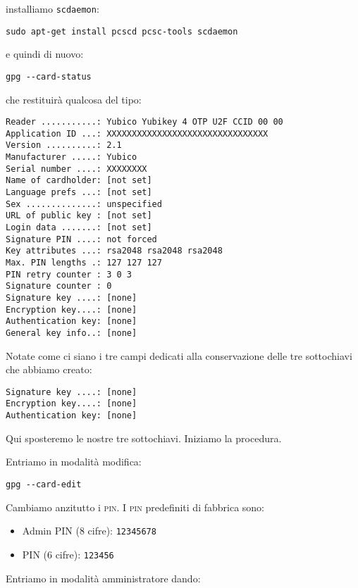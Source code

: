 installiamo \texttt{scdaemon}:

\begin{lstlisting}
sudo apt-get install pcscd pcsc-tools scdaemon
\end{lstlisting}

e quindi di nuovo:

\begin{lstlisting}
gpg --card-status
\end{lstlisting}

che restituirà qualcosa del tipo:

\begin{lstlisting}
Reader ...........: Yubico Yubikey 4 OTP U2F CCID 00 00
Application ID ...: XXXXXXXXXXXXXXXXXXXXXXXXXXXXXXXX
Version ..........: 2.1
Manufacturer .....: Yubico
Serial number ....: XXXXXXXX
Name of cardholder: [not set]
Language prefs ...: [not set]
Sex ..............: unspecified
URL of public key : [not set]
Login data .......: [not set]
Signature PIN ....: not forced
Key attributes ...: rsa2048 rsa2048 rsa2048
Max. PIN lengths .: 127 127 127
PIN retry counter : 3 0 3
Signature counter : 0
Signature key ....: [none]
Encryption key....: [none]
Authentication key: [none]
General key info..: [none]
\end{lstlisting}

Notate come ci siano i tre campi dedicati alla conservazione delle tre
sottochiavi che abbiamo creato:

\begin{lstlisting}
Signature key ....: [none]
Encryption key....: [none]
Authentication key: [none]
\end{lstlisting}

Qui sposteremo le nostre tre sottochiavi. Iniziamo la procedura.

Entriamo in modalità modifica:

\begin{lstlisting}
gpg --card-edit
\end{lstlisting}

Cambiamo anzitutto i \textsc{pin}. I \textsc{pin} predefiniti di fabbrica sono:

\begin{itemize}
    \item Admin PIN (8 cifre): \texttt{12345678}
    \item PIN (6 cifre): \texttt{123456}
\end{itemize}

Entriamo in modalità amministratore dando:

